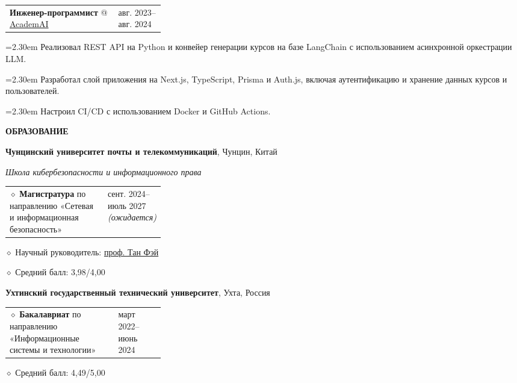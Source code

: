\documentclass[11pt,a4paper]{article}
\makeatletter
\newcommand{\cvrow}[2]{%
  \noindent
  \begin{minipage}[t]{0.145\textwidth}
    \vspace{0pt}%
    \raggedright
    \fontsize{8.5}{10}\selectfont
    \bfseries\MakeUppercase{#1}
  \end{minipage}%
  \hfill
  \begin{minipage}[t]{0.835\textwidth}
    \vspace{0pt}%
    #2
  \end{minipage}\par
}
\newcommand{\eduentry}[2]{%
  \noindent
  \begin{tabularx}{\linewidth}
    {@{}X@{\hspace{0.8em}}
    >{\raggedleft\arraybackslash}p{0.30\linewidth}@{}}
    #1 & \small #2
  \end{tabularx}\par
  \vspace{0.15em}
}
\newcommand{\edudetail}[1]{%
  \noindent\hspace*{1.15em}$\diamond$ #1\par
}
\newcommand{\workentry}[2]{%
  \noindent
  \begin{tabularx}{\linewidth}
    {@{}X@{\hspace{0.8em}}
    >{\raggedleft\arraybackslash}p{0.30\linewidth}@{}}
    #1 & \small #2
  \end{tabularx}\par
  \vspace{0.15em}
}
\newcommand{\workproject}[1]{%
  \noindent
  \hangindent=2.30em
  \hangafter=1
  \hspace*{1.15em}\makebox[1.15em][l]{$\diamond$}#1\par
  \vspace{0.12em}
}
\makeatother
\begin{document}
\vspace{0.50em}

\cvrow{}{%
  \workentry
    {\textbf{Инженер-программист} @ \href{https://academai.ru/}{AcademAI}}
    {авг. 2023--авг. 2024}

  \workproject{Реализовал REST API на Python и конвейер генерации курсов на 
  базе LangChain с использованием асинхронной оркестрации LLM.}
  \workproject{Разработал слой приложения на Next.js, TypeScript,
  Prisma и Auth.js, включая аутентификацию и хранение данных курсов и пользователей.}
  \workproject{Настроил CI/CD с использованием Docker и GitHub Actions.}
}

\vspace{0.75em}

\cvrow{Образование}{%
  \raggedright

  \textbf{Чунцинский университет почты и телекоммуникаций},
  Чунцин, Китай\par
  \textit{Школа кибербезопасности и информационного права}\par
  \vspace{0.12em}

  \eduentry
    {$\diamond$ \textbf{Магистратура} по направлению «Сетевая и информационная безопасность»}
    {сент. 2024--июль 2027 \textit{(ожидается)}}

  \edudetail{Научный руководитель:
    \href{https://faculty.cqupt.edu.cn/tangfei/en/index.htm}{проф. Тан Фэй}}
  \edudetail{Средний балл: 3,98/4,00}

  \vspace{0.48em}

  \textbf{Ухтинский государственный технический университет},
  Ухта, Россия\par
  \vspace{0.12em}

  \eduentry
    {$\diamond$ \textbf{Бакалавриат} по направлению «Информационные системы и технологии»}
    {март 2022--июнь 2024}

  \edudetail{Средний балл: 4,49/5,00}

  \vspace{0.48em}


}
\end{document}
